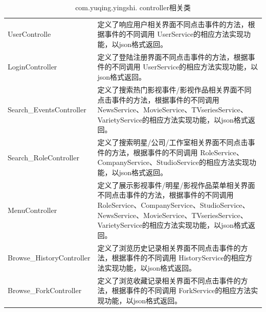 \begin{table}
	\caption{com.yuqing.yingshi. controller相关类}
	\centering
	\begin{tabular}{|p{4.5cm}|p{8.5cm}|} 
		\hline 
		\rowcolor[HTML]{DAE8FC} 
\multicolumn{2}{|c|}{com.yuqing.yingshi. controller相关类} \\ 
\hline 
UserControlle&定义了响应用户相关界面不同点击事件的方法，根据事件的不同调用 UserService的相应方法实现功能，以json格式返回。\\
LoginController&定义了登陆注册界面不同点击事件的方法，根据事件的不同调用 UserService的相应方法实现功能，以json格式返回。\\
Search\_EventsController&定义了搜索热门影视事件/影视作品相关界面不同点击事件的方法，根据事件的不同调用 NewsService、MovieService、TVseriesService、VarietyService的相应方法实现功能，以json格式返回。\\
Search\_RoleController&定义了搜索明星/公司/工作室相关界面不同点击事件的方法，根据事件的不同调用 RoleService、CompanyService、StudioService的相应方法实现功能，以json格式返回。\\
MenuController&定义了展示影视事件/明星/影视作品菜单相关界面不同点击事件的方法，根据事件的不同调用 RoleService、CompanyService、StudioService、NewsService、MovieService、TVseriesService、VarietyService的相应方法实现功能，以json格式返回。\\
Browse\_HistoryController&定义了浏览历史记录相关界面不同点击事件的方法，根据事件的不同调用 HistoryService的相应方法实现功能，以json格式返回。\\
Browse\_ForkController&定义了浏览收藏记录相关界面不同点击事件的方法，根据事件的不同调用 ForkService的相应方法实现功能，以json格式返回。\\
\hline 
\end{tabular}
\end{table}
